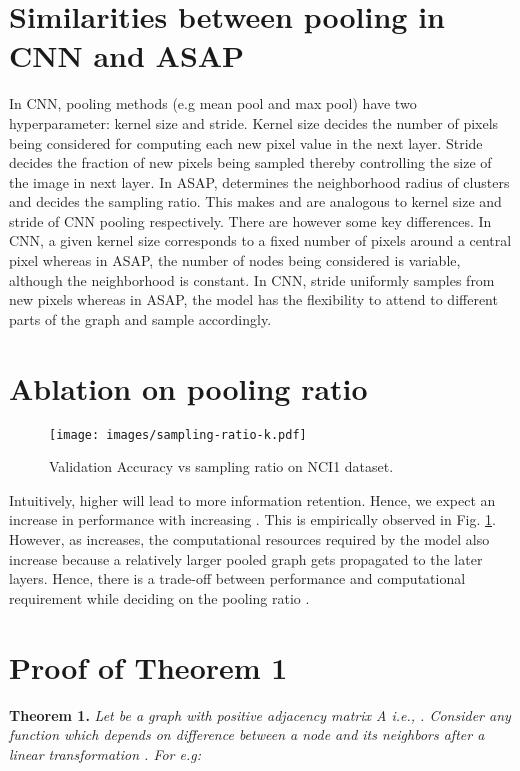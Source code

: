 \documentclass[letterpaper]{article} \usepackage{aaai20}  \usepackage{times}  \usepackage{helvet} \usepackage{courier}  \usepackage[hyphens]{url}  \usepackage{graphicx} \urlstyle{rm} \def\UrlFont{\rm}  \usepackage{graphicx}  \frenchspacing  \setlength{\pdfpagewidth}{8.5in}  \setlength{\pdfpageheight}{11in}
\begin{document}
	\section{Similarities between pooling in CNN and ASAP}
	\label{ssec:cnn-asap}
In CNN, pooling methods (e.g mean pool and max pool) have two hyperparameter: kernel size and stride. Kernel size decides the number of pixels being considered for computing each new pixel value in the next layer. Stride decides the fraction of new pixels being sampled thereby controlling the size of the image in next layer. In ASAP,  determines the neighborhood radius of clusters and  decides the sampling ratio. This makes  and  are analogous to kernel size and stride of CNN pooling respectively. There are however some key differences. In CNN, a given kernel size corresponds to a fixed number of pixels around a central pixel whereas in ASAP, the number of nodes being considered is variable, although the neighborhood  is constant. In CNN, stride uniformly samples from new pixels whereas in ASAP, the model has the flexibility to attend to different parts of the graph and sample accordingly.
	
	
	\section{Ablation on pooling ratio }
	\label{ssec:ablation-k}
	
	\begin{figure}[!ht]
		\centering
		\texttt{[image: images/sampling-ratio-k.pdf]}
		\caption{\label{fig:sampling-ratio-k} Validation Accuracy vs sampling ratio  on NCI1 dataset.}
	\end{figure}
	
	Intuitively, higher  will lead to more information retention. Hence, we expect an increase in performance with increasing . This is empirically observed in Fig. \ref{fig:sampling-ratio-k}. However, as  increases, the computational resources required by the model also increase because a relatively larger pooled graph gets propagated to the later layers. Hence, there is a trade-off between performance and computational requirement while deciding on the pooling ratio .
	
	
	\section{Proof of Theorem 1}
	\label{ssec:gconv-proof}
\textbf{Theorem 1.}
	\textit{
		Let  be a graph with positive adjacency matrix A i.e., . Consider any function  which depends on difference between a node and its neighbors after a linear transformation . For e.g:}
	
\end{document}
